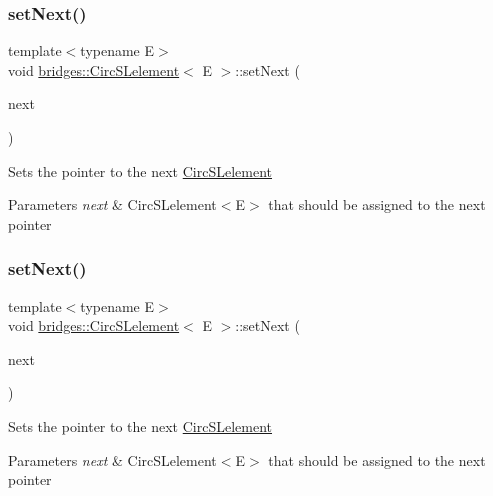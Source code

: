 \subsubsection{\texorpdfstring{set\+Next()}{setNext()}\hspace{0.1cm}{\footnotesize\ttfamily [1/2]}}
{\footnotesize\ttfamily template$<$typename E$>$ \\
void \mbox{\hyperlink{classbridges_1_1_circ_s_lelement}{bridges\+::\+Circ\+S\+Lelement}}$<$ E $>$\+::set\+Next (\begin{DoxyParamCaption}\item[{\mbox{\hyperlink{classbridges_1_1_circ_s_lelement}{Circ\+S\+Lelement}}$<$ E $>$ $\ast$}]{next }\end{DoxyParamCaption})\hspace{0.3cm}{\ttfamily [inline]}}

Sets the pointer to the next \mbox{\hyperlink{classbridges_1_1_circ_s_lelement}{Circ\+S\+Lelement}} 
\begin{DoxyParams}{Parameters}
{\em next} & Circ\+S\+Lelement$<$\+E$>$ that should be assigned to the next pointer \\
\hline
\end{DoxyParams}
\mbox{\label{classbridges_1_1_circ_s_lelement_a7b2512dd1cc559f0a89d9ab4aafed172}} 
\subsubsection{\texorpdfstring{set\+Next()}{setNext()}\hspace{0.1cm}{\footnotesize\ttfamily [2/2]}}
{\footnotesize\ttfamily template$<$typename E$>$ \\
void \mbox{\hyperlink{classbridges_1_1_circ_s_lelement}{bridges\+::\+Circ\+S\+Lelement}}$<$ E $>$\+::set\+Next (\begin{DoxyParamCaption}\item[{\mbox{\hyperlink{classbridges_1_1_circ_s_lelement}{Circ\+S\+Lelement}}$<$ E $>$ $\ast$}]{next }\end{DoxyParamCaption})\hspace{0.3cm}{\ttfamily [inline]}}

Sets the pointer to the next \mbox{\hyperlink{classbridges_1_1_circ_s_lelement}{Circ\+S\+Lelement}} 
\begin{DoxyParams}{Parameters}
{\em next} & Circ\+S\+Lelement$<$\+E$>$ that should be assigned to the next pointer \\
\hline
\end{DoxyParams}


